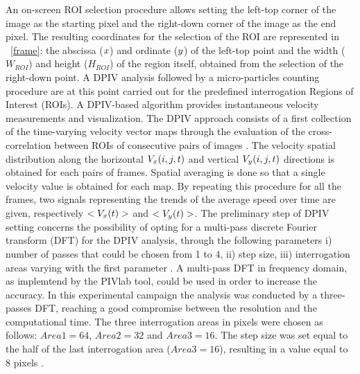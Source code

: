 \documentclass[journal]{IEEEtran}
\theoremstyle{definition}
\theoremstyle{remark}
\begin{document}
An on-screen ROI selection procedure allows setting the left-top corner of the image as the starting pixel and the right-down corner of the image as the end pixel. The resulting coordinates for the selection of the ROI are represented in ~\fig\ref{frame}: the abscissa ($x$) and ordinate ($y$) of the left-top point and the width ($W_{ROI}$) and height ($H_{ROI}$) of the region itself, obtained from the selection of the right-down point. 
A DPIV analysis followed by a micro-particles counting procedure are at this point carried out for the predefined interrogation Regions of Interest (ROIs). A DPIV-based algorithm provides instantaneous velocity measurements and visualization. The DPIV approach consists of a first collection of the time-varying velocity vector maps through the evaluation of the cross-correlation between ROIs of consecutive pairs of images . 
The velocity spatial distribution along the horizontal $V_{x}({i},{j},t)$ and vertical $V_{y}({i},{j},t)$ directions is obtained for each pairs of frames. Spatial averaging is done so that a single velocity value is obtained for each map. By repeating this procedure for all the frames, two signals representing the trends of the average speed over time are given, respectively $<V_{x}(t)>$ and $<V_{y}(t)>$.
The preliminary step of DPIV setting concerns the possibility of opting for a multi-pass discrete Fourier transform (DFT) for the DPIV analysis, through the following parameters i) number of passes that could be chosen from 1 to 4, ii) step size, iii) interrogation areas varying with the first parameter . 
A multi-pass DFT in frequency domain, as implemtend by the PIVlab tool, could be used in order to increase the accuracy. In this experimental campaign the analysis was conducted by a three-passes DFT, reaching a good compromise between the resolution and the computational time. The three interrogation areas in pixels were chosen as follows: $Area1=64$, $Area2=32$ and $Area3=16$. The step size was set equal to the half of the last interrogation area ($Area3=16$), resulting in a value equal to 8 pixels .
\end{document}
